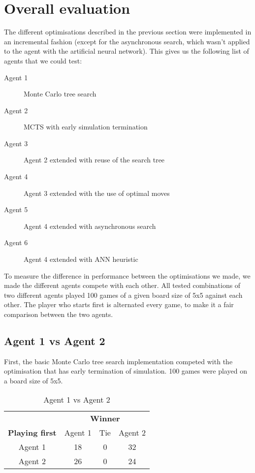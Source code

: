 \section{Overall evaluation}

The different optimisations described in the previous section were implemented in an incremental fashion (except for the asynchronous search, which wasn't applied to the agent with the artificial neural network). This gives us the following list of agents that we could test:
\begin{description}
	\item[Agent 1] Monte Carlo tree search
	\item[Agent 2] MCTS with early simulation termination
	\item[Agent 3] Agent 2 extended with reuse of the search tree
	\item[Agent 4] Agent 3 extended with the use of optimal moves
	\item[Agent 5] Agent 4 extended with asynchronous search
	\item[Agent 6] Agent 4 extended with ANN heuristic
\end{description}

To measure the difference in performance between the optimisations we made, we made the different agents compete with each other. All tested combinations of two different agents played 100 games of a given board size of 5x5 against each other. The player who starts first is alternated every game, to make it a fair comparison between the two agents.

\subsection{Agent 1 vs Agent 2}
First, the basic Monte Carlo tree search implementation competed with the optimisation that has early termination of simulation. 100 games were played on a board size of 5x5.

\begin{table}[!h]
	\centering
	\label{result:Ag1vsAg2}
	\begin{tabular}{c | c | c | c}
		& \multicolumn{3}{c}{\textbf{Winner}}        \\
		\textbf{Playing first} & Agent 1 & Tie & Agent 2 \\ \hline
		Agent 1 & 18 & 0 & 32 \\ \hline
		Agent 2 & 26 & 0 & 24
	\end{tabular}
	\caption{Agent 1 vs Agent 2}
\end{table}

